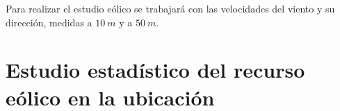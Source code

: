 \documentclass[12pt]{report}
\begin{document}


Para realizar el estudio eólico se trabajará con las velocidades del viento y su dirección, medidas a $10\ m$ y a $50\ m$.




\section{Estudio estadístico del recurso eólico en la ubicación}





\end{document}
